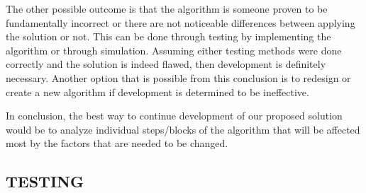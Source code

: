 \documentclass[a4,draftclsnofoot,onecolumn,margin=0.75,10pt]{IEEEtran}
\begin{document}
{The other possible outcome is that the algorithm is someone proven to be fundamentally incorrect or there are not noticeable differences between applying the solution or not. This can be done through testing by implementing the algorithm or through simulation. Assuming either testing methods were done correctly and the solution is indeed flawed, then development is definitely necessary. Another option that is possible from this conclusion is to redesign or create a new algorithm if development is determined to be ineffective.

In conclusion, the best way to continue development of our proposed solution would be to analyze individual steps/blocks of the algorithm that will be affected most by the factors that are needed to be changed.}

\subsection[TESTING]{\rmfamily\color{black}
TESTING}
\end{document}
